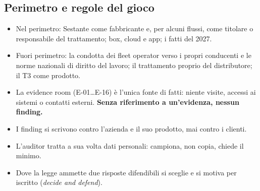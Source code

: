 \subsection{Perimetro e regole del gioco}
\begin{itemize}
  \item Nel perimetro: Sestante come fabbricante e, per alcuni flussi, come titolare o responsabile
    del trattamento; box, cloud e app; i fatti del 2027.
  \item Fuori perimetro: la condotta dei fleet operator verso i propri conducenti e le norme nazionali
    di diritto del lavoro; il trattamento proprio del distributore; il T3 come prodotto.
  \item La evidence room (E-01\ldots E-16) è l'unica fonte di fatti: niente visite, accessi ai sistemi
    o contatti esterni. \textbf{Senza riferimento a un'evidenza, nessun finding.}
  \item I finding si scrivono contro l'azienda e il suo prodotto, mai contro i clienti.
  \item L'auditor tratta a sua volta dati personali: campiona, non copia, chiede il minimo.
  \item Dove la legge ammette due risposte difendibili si sceglie e si motiva per iscritto
    (\emph{decide and defend}).
\end{itemize}

